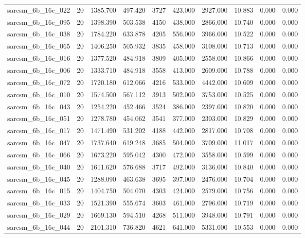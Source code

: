 \begin{tabular}{lrrrrrrrrr}
sarcsm\_6b\_16c\_022 & 20 & 1385.700 & 497.420 & 3727 & 423.000 & 2927.000 & 10.883 & 0.000 & 0.000 \\
sarcsm\_6b\_16c\_095 & 20 & 1398.390 & 503.538 & 4150 & 438.000 & 2866.000 & 10.740 & 0.000 & 0.000 \\
sarcsm\_6b\_16c\_038 & 20 & 1784.220 & 633.878 & 4205 & 556.000 & 3966.000 & 10.522 & 0.000 & 0.000 \\
sarcsm\_6b\_16c\_065 & 20 & 1406.250 & 505.932 & 3835 & 458.000 & 3108.000 & 10.713 & 0.000 & 0.000 \\
sarcsm\_6b\_16c\_016 & 20 & 1377.520 & 484.918 & 3809 & 405.000 & 2558.000 & 10.866 & 0.000 & 0.000 \\
sarcsm\_6b\_16c\_006 & 20 & 1333.710 & 484.918 & 3558 & 413.000 & 2609.000 & 10.788 & 0.000 & 0.000 \\
sarcsm\_6b\_16c\_072 & 20 & 1720.180 & 612.066 & 4216 & 533.000 & 4442.000 & 10.609 & 0.000 & 0.000 \\
sarcsm\_6b\_16c\_010 & 20 & 1574.500 & 567.112 & 3913 & 502.000 & 3753.000 & 10.525 & 0.000 & 0.000 \\
sarcsm\_6b\_16c\_043 & 20 & 1254.220 & 452.466 & 3524 & 386.000 & 2397.000 & 10.820 & 0.000 & 0.000 \\
sarcsm\_6b\_16c\_051 & 20 & 1278.780 & 454.062 & 3541 & 377.000 & 2303.000 & 10.829 & 0.000 & 0.000 \\
sarcsm\_6b\_16c\_017 & 20 & 1471.490 & 531.202 & 4188 & 442.000 & 2817.000 & 10.708 & 0.000 & 0.000 \\
sarcsm\_6b\_16c\_047 & 20 & 1737.640 & 619.248 & 3685 & 504.000 & 3709.000 & 11.017 & 0.000 & 0.000 \\
sarcsm\_6b\_16c\_066 & 20 & 1673.220 & 595.042 & 4300 & 472.000 & 3558.000 & 10.599 & 0.000 & 0.000 \\
sarcsm\_6b\_16c\_040 & 20 & 1611.620 & 576.688 & 3717 & 492.000 & 3136.000 & 10.840 & 0.000 & 0.000 \\
sarcsm\_6b\_16c\_045 & 20 & 1288.090 & 463.638 & 3695 & 397.000 & 2476.000 & 10.704 & 0.000 & 0.000 \\
sarcsm\_6b\_16c\_015 & 20 & 1404.750 & 504.070 & 4303 & 424.000 & 2579.000 & 10.756 & 0.000 & 0.000 \\
sarcsm\_6b\_16c\_033 & 20 & 1521.390 & 555.674 & 3603 & 461.000 & 2796.000 & 10.719 & 0.000 & 0.000 \\
sarcsm\_6b\_16c\_029 & 20 & 1669.130 & 594.510 & 4268 & 511.000 & 3948.000 & 10.791 & 0.000 & 0.000 \\
sarcsm\_6b\_16c\_044 & 20 & 2101.310 & 736.820 & 4621 & 641.000 & 5331.000 & 10.553 & 0.000 & 0.000 \\

\end{tabular}
